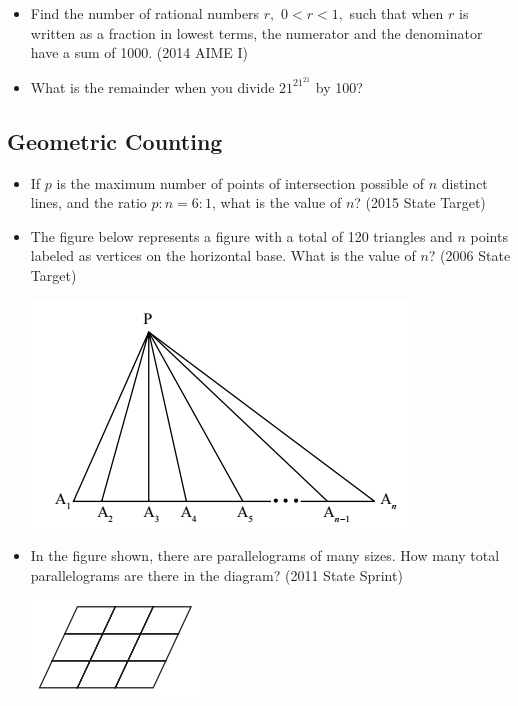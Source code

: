 \documentclass{article}
\begin{document}
\begin{itemize}

\item Find the number of rational numbers $r,$ $0<r<1,$ such that when $r$ is written as a fraction in lowest terms, the numerator and the denominator have a sum of 1000. (2014 AIME I)

%
\item What is the remainder when you divide $21^{21^{21}}$ by 100? 

\end{itemize}

\subsection{Geometric Counting}

\begin{itemize}

\item If $p$ is the maximum number of points of intersection possible of $n$ distinct lines, and the ratio $p:n=6:1$, what is the value of $n$? (2015 State Target)

\item The figure below represents a figure with a total of 120 triangles and $n$ points labeled as vertices on the horizontal base. What is the value of $n$? (2006 State Target)

\centerline{\includegraphics{2006Target.png}}

\item In the figure shown, there are parallelograms of many sizes. How many total parallelograms are there in the diagram? (2011 State Sprint)

\centerline{\includegraphics{201110.png}} 


\end{itemize}
\end{document}
